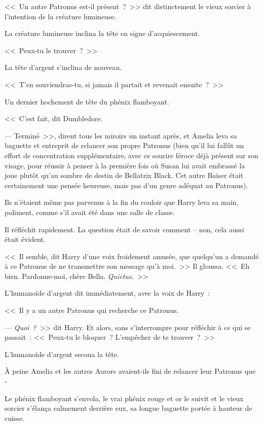 <<~Un autre Patronus est-il présent~?~>> dit distinctement le vieux sorcier à l'intention de la créature lumineuse.

La créature lumineuse inclina la tête en signe d'acquiescement.

<<~Peux-tu le trouver~?~>>

La tête d'argent s'inclina de nouveau.

<<~T'en souviendras-tu, si jamais il partait et revenait ensuite~?~>>

Un dernier hochement de tête du phénix flamboyant.

<<~C'est fait, dit Dumbledore.

--- Terminé~>>, dirent tous les miroirs un instant après, et Amelia leva sa baguette et entreprit de relancer son propre Patronus (bien qu'il lui fallût un effort de concentration supplémentaire, avec ce sourire féroce déjà présent sur son visage, pour réussir à penser à la première fois où Susan lui avait embrassé la joue plutôt qu'au sombre de destin de Bellatrix Black. Cet autre Baiser était certainement une pensée heureuse, mais pas d'un genre adéquat au Patronus).

\later

Ils n'étaient même pas parvenus à la fin du couloir que Harry leva sa main, poliment, comme s'il avait été dans une salle de classe.

Il réfléchit rapidement. La question était de savoir comment -- non, cela aussi était évident.

<<~Il semble, dit Harry d'une voix froidement amusée, que quelqu'un a demandé à ce Patronus de ne transmettre son message qu'à moi.~>> Il gloussa. <<~Eh bien. Pardonne-moi, chère Bella. \emph{Quietus}.~>>

L'humanoïde d'argent dit immédiatement, avec la voix de Harry~:

<<~Il y a un autre Patronus qui recherche ce Patronus.

--- \emph{Quoi~?}~>> dit Harry. Et alors, sans s'interrompre pour réfléchir à ce qui se passait~: <<~Peux-tu le bloquer~? L'empêcher de te trouver~?~>>

L'humanoïde d'argent secoua la tête.

\later

À peine Amelia et les autres Aurors avaient-ils fini de relancer leur Patronus que -

Le phénix flamboyant s'envola, le vrai phénix rouge et or le suivit et le vieux sorcier s'élança calmement derrière eux, sa longue baguette portée à hauteur de cuisse.

